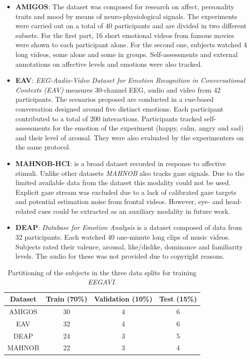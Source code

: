 \begin{itemize}
    \item \textbf{AMIGOS}: The dataset was composed for research on affect, personality traits and mood by means of neuro-physiological signals.
    The experiments were carried out on a total of 40 participants and are divided in two different subsets.
    For the first part, 16 short emotional videos from famous movies were shown to each participant alone.
    For the second one, subjects watched 4 long videos, some alone and some in groups.
    Self-assessments and external annotations on affective levels and emotions were also tracked.

    \item \textbf{EAV}: \textit{EEG-Audio-Video Dataset for Emotion Recognition in Conversational Contexts (EAV)}
    measures 30-channel EEG, audio and video from 42 participants.
    The scenarios proposed are conducted in a cue-based conversation designed around five distinct emotions.
    Each participant contributed to a total of 200 interactions.
    Participants tracked self-assessments for the emotion of the experiment (happy, calm, angry and sad) and their level of arousal.
    They were also evaluated by the experimenters on the same protocol.

    \item \textbf{MAHNOB-HCI}: is a broad dataset recorded in response to affective stimuli.
    Unlike other datasets \textit{MAHNOB} also tracks gaze signals.
    Due to the limited available data from the dataset this modality could not be used.
    Explicit gaze stream was excluded due to a lack of calibrated gaze targets and potential estimation noise from frontal videos.
    However, eye- and head-related cues could be extracted as an auxiliary modality in future work.

    \item \textbf{DEAP}: \textit{Database for Emotion Analysis} is a dataset composed of data from 32 participants.
    Each watched 40 one-minute long clips of music videos.
    Subjects rated their valence, arousal, like/dislike, dominance and familiarity levels.
    The audio for these was not provided due to copyright reasons.

\end{itemize}


\begin{table}
    \centering
    \begin{tabular}{c | c | c | c }
        Dataset & Train (70\%) & Validation (10\%) & Test (15\%) \\
        \hline
        AMIGOS  & 30           & 4                 & 6           \\
        EAV     & 32           & 4                 & 6           \\
        DEAP    & 24           & 3                 & 5           \\
        MAHNOB  & 22           & 3                 & 4           \\
    \end{tabular}
    \caption{
        Partitioning of the subjects in the three data splits for training \textit{EEGAVI}.
    }
    \label{tab:datasetspartitoning}
\end{table}

